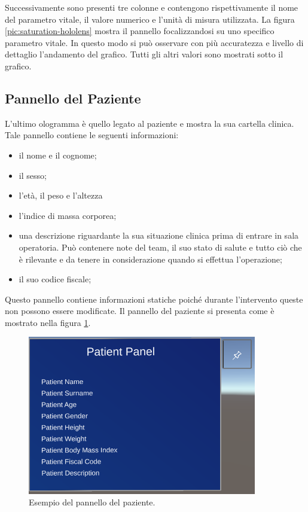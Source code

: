 Successivamente sono presenti tre colonne e contengono rispettivamente il nome del parametro vitale, il valore numerico e l'unità di misura utilizzata. \newline \newline La figura \ref{pic:saturation-hololens} mostra il pannello focalizzandosi su uno specifico parametro vitale. In questo modo si può osservare con più accuratezza e livello di dettaglio l'andamento del grafico. Tutti gli altri valori sono mostrati sotto il grafico.

\subsection{Pannello del Paziente}
L'ultimo ologramma è quello legato al paziente e mostra la sua cartella clinica. Tale pannello contiene le seguenti informazioni:
\begin{itemize}
    \item il nome e il cognome;
    \item il sesso;
    \item l'età, il peso e l'altezza
    \item l'indice di massa corporea;
    \item una descrizione riguardante la sua situazione clinica prima di entrare in sala operatoria. Può contenere note del team, il suo stato di salute e tutto ciò che è rilevante e da tenere in considerazione quando si effettua l'operazione;
    \item il suo codice fiscale;
\end{itemize}

Questo pannello contiene informazioni statiche poiché durante l'intervento queste non possono essere modificate. Il pannello del paziente si presenta come è mostrato nella figura \ref{pic:patient-panel}.

\begin{figure}[ht]
    \includegraphics[width=10cm]{Images/PatientPanel.PNG}
    \centering
    \caption{\label{pic:patient-panel}Esempio del pannello del paziente.}
\end{figure}